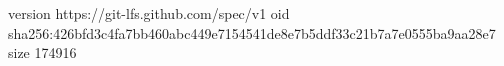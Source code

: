 version https://git-lfs.github.com/spec/v1
oid sha256:426bfd3c4fa7bb460abc449e7154541de8e7b5ddf33c21b7a7e0555ba9aa28e7
size 174916
